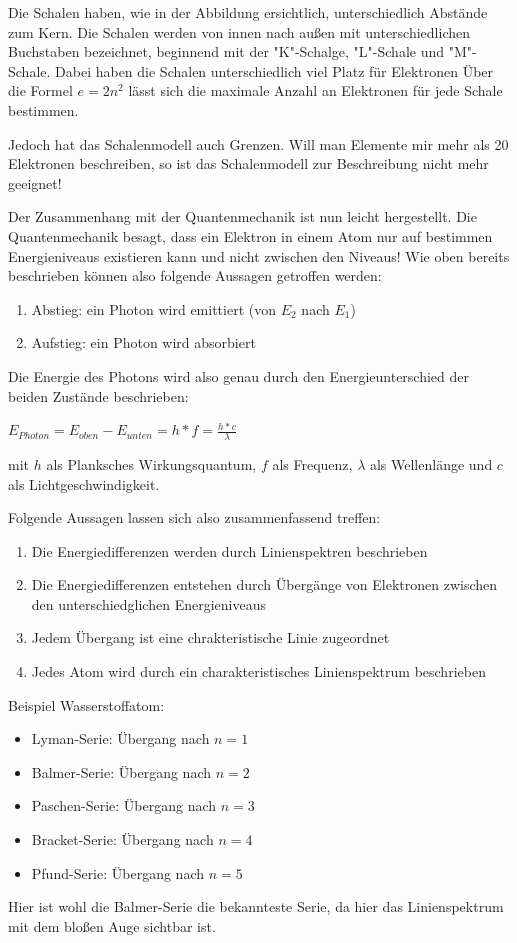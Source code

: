 \documentclass{article}
\begin{document}
    Die Schalen haben, wie in der Abbildung ersichtlich, unterschiedlich Abstände zum Kern. Die Schalen werden von innen nach außen mit unterschiedlichen Buchstaben bezeichnet, beginnend mit der "K"-Schalge, "L"-Schale und "M"-Schale. Dabei haben die Schalen unterschiedlich viel Platz für Elektronen  Über die Formel $e=2n^2$ lässt sich die maximale Anzahl an Elektronen für jede Schale bestimmen.

    Jedoch hat das Schalenmodell auch Grenzen. Will man Elemente mir mehr als 20 Elektronen beschreiben, so ist das Schalenmodell zur Beschreibung nicht mehr geeignet!


    Der Zusammenhang mit der Quantenmechanik ist nun leicht hergestellt. Die Quantenmechanik besagt, dass ein Elektron in einem Atom nur auf bestimmen Energieniveaus existieren kann und nicht zwischen den Niveaus! Wie oben bereits beschrieben können also folgende Aussagen getroffen werden:
        \begin{enumerate}[label=\arabic*.]
            \item Abstieg: ein Photon wird emittiert (von $E_2$ nach $E_1$)
            \item Aufstieg: ein Photon wird absorbiert
        \end{enumerate}
    Die Energie des Photons wird also genau durch den Energieunterschied der beiden Zustände beschrieben: 
    \begin{center}
        $E_{Photon}=E_{oben}-E_{unten}=h*f=\frac{h*c}{\lambda}$ 
    \end{center}

    mit $h$ als Planksches Wirkungsquantum, $f$ als Frequenz, $\lambda$ als Wellenlänge und $c$ als Lichtgeschwindigkeit.

    Folgende Aussagen lassen sich also zusammenfassend treffen:
    \begin{enumerate}[label=\arabic*.]
            \item Die Energiedifferenzen werden durch Linienspektren beschrieben
            \item Die Energiedifferenzen entstehen durch Übergänge von Elektronen zwischen den unterschiedglichen Energieniveaus
            \item Jedem Übergang ist eine chrakteristische Linie zugeordnet
            \item Jedes Atom wird durch ein charakteristisches Linienspektrum beschrieben
        \end{enumerate}

    Beispiel Wasserstoffatom:
    \begin{itemize}
        \item Lyman-Serie: Übergang nach $n=1$
        \item Balmer-Serie: Übergang nach $n=2$
        \item Paschen-Serie: Übergang nach $n=3$
        \item Bracket-Serie: Übergang nach $n=4$
        \item Pfund-Serie: Übergang nach $n=5$
    \end{itemize}
    Hier ist wohl die Balmer-Serie die bekannteste Serie, da hier das Linienspektrum mit dem bloßen Auge sichtbar ist.
\end{document}
